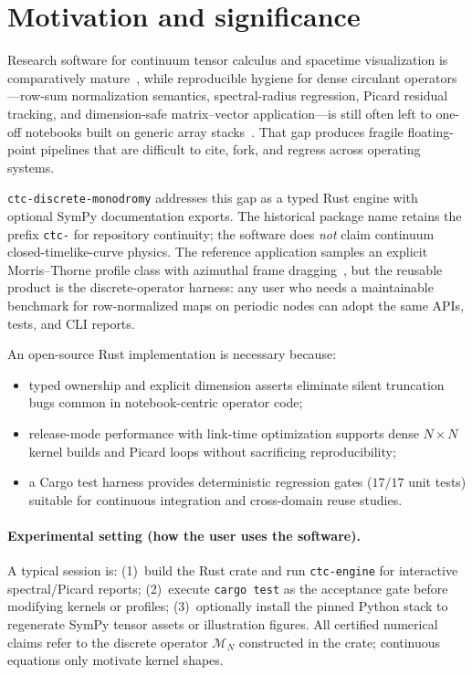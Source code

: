 \documentclass[preprint,12pt,a4paper]{elsarticle}
\newcommand{\MN}{\mathcal{M}_{N}}
\begin{document}
\section{Motivation and significance}
\label{sec:motivation}

Research software for continuum tensor calculus and spacetime visualization is comparatively mature~\cite{Meurer2017,Bapat2019,SageManifolds,BaumgarteShapiro2010}, while reproducible hygiene for dense circulant operators---row-sum normalization semantics, spectral-radius regression, Picard residual tracking, and dimension-safe matrix--vector application---is still often left to one-off notebooks built on generic array stacks~\cite{Harris2020,Virtanen2020,Trefethen2000}.
That gap produces fragile floating-point pipelines that are difficult to cite, fork, and regress across operating systems.

\texttt{ctc-discrete-monodromy} addresses this gap as a typed Rust engine with optional SymPy documentation exports.
The historical package name retains the prefix \texttt{ctc-} for repository continuity; the software does \emph{not} claim continuum closed-timelike-curve physics.
The reference application samples an explicit Morris--Thorne profile class with azimuthal frame dragging~\cite{Morris1988,Visser1995,HawkingEllis1973}, but the reusable product is the discrete-operator harness: any user who needs a maintainable benchmark for row-normalized maps on periodic nodes can adopt the same APIs, tests, and CLI reports.

An open-source Rust implementation is necessary because:
\begin{itemize}
  \item typed ownership and explicit dimension asserts eliminate silent truncation bugs common in notebook-centric operator code;
  \item release-mode performance with link-time optimization supports dense $N\times N$ kernel builds and Picard loops without sacrificing reproducibility;
  \item a Cargo test harness provides deterministic regression gates ($17/17$ unit tests) suitable for continuous integration and cross-domain reuse studies.
\end{itemize}

\paragraph{Experimental setting (how the user uses the software).}
A typical session is:
(1)~build the Rust crate and run \texttt{ctc-engine} for interactive spectral/Picard reports;
(2)~execute \texttt{cargo test} as the acceptance gate before modifying kernels or profiles;
(3)~optionally install the pinned Python stack to regenerate SymPy tensor assets or illustration figures.
All certified numerical claims refer to the discrete operator $\MN$ constructed in the crate; continuous equations only motivate kernel shapes.
\end{document}
